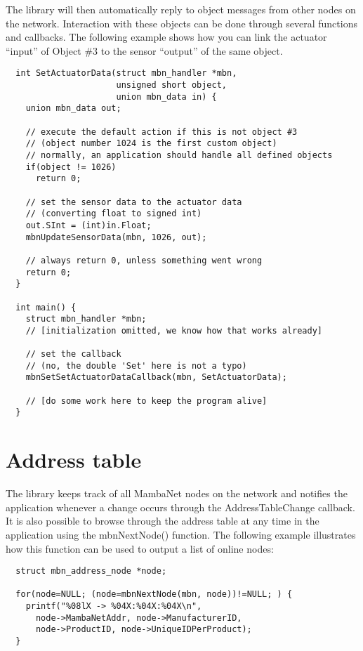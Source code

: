 The library will then automatically reply to object messages from other nodes on the network. Interaction with these objects can be done through several functions and callbacks. The following example shows how you can link the actuator ``input'' of Object \#3 to the sensor ``output'' of the same object.
\begin{verbatim}
  int SetActuatorData(struct mbn_handler *mbn,
                      unsigned short object,
                      union mbn_data in) {
    union mbn_data out;
    
    // execute the default action if this is not object #3
    // (object number 1024 is the first custom object)
    // normally, an application should handle all defined objects
    if(object != 1026)
      return 0;

    // set the sensor data to the actuator data
    // (converting float to signed int)
    out.SInt = (int)in.Float;
    mbnUpdateSensorData(mbn, 1026, out);
    
    // always return 0, unless something went wrong
    return 0;
  }
  
  int main() {
    struct mbn_handler *mbn;
    // [initialization omitted, we know how that works already]
    
    // set the callback
    // (no, the double 'Set' here is not a typo)
    mbnSetSetActuatorDataCallback(mbn, SetActuatorData);
    
    // [do some work here to keep the program alive]
  }
\end{verbatim}



\section{Address table}
The library keeps track of all MambaNet nodes on the network and notifies the application whenever a change occurs through the AddressTableChange callback. It is also possible to browse through the address table at any time in the application using the mbnNextNode() function. The following example illustrates how this function can be used to output a list of online nodes:
\begin{verbatim}
  struct mbn_address_node *node;

  for(node=NULL; (node=mbnNextNode(mbn, node))!=NULL; ) {
    printf("%08lX -> %04X:%04X:%04X\n",
      node->MambaNetAddr, node->ManufacturerID,
      node->ProductID, node->UniqueIDPerProduct);
  }
\end{verbatim}

